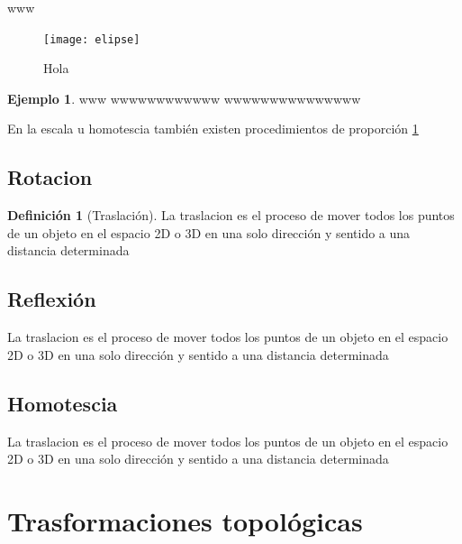 \documentclass[
  16pt,
]{krantz}
\theoremstyle{definition}
\newtheorem{definition}{Definición}[chapter]
\theoremstyle{definition}
\newtheorem{example}{Ejemplo}[chapter]
\theoremstyle{definition}
\theoremstyle{definition}
\theoremstyle{remark}
\begin{document}
www

\begin{figure}

{\centering \texttt{[image: elipse]} 

}

\caption{Hola}\label{fig:Doge}
\end{figure}

\begin{example}
\protect\hypertarget{exm:unnamed-chunk-4}{}{\label{exm:unnamed-chunk-4} }www wwwwwwwwwwww wwwwwwwwwwwwwww
\end{example}

En la escala u homotescia también existen procedimientos de proporción \ref{fig:Doge}

\hypertarget{rotacion}{%
\subsection{Rotacion}\label{rotacion}}

\begin{definition}[Traslación]
\protect\hypertarget{def:rotacion}{}{\label{def:rotacion} {} }La traslacion es el proceso de mover todos los puntos de un objeto en el espacio 2D o 3D en una solo dirección y sentido a una distancia determinada
\end{definition}

\hypertarget{reflexiuxf3n}{%
\subsection{Reflexión}\label{reflexiuxf3n}}

La traslacion es el proceso de mover todos los puntos de un objeto en el espacio 2D o 3D en una solo dirección y sentido a una distancia determinada

\hypertarget{homotescia}{%
\subsection{Homotescia}\label{homotescia}}

La traslacion es el proceso de mover todos los puntos de un objeto en el espacio 2D o 3D en una solo dirección y sentido a una distancia determinada

\hypertarget{trasformaciones-topoluxf3gicas}{%
\section{Trasformaciones topológicas}\label{trasformaciones-topoluxf3gicas}}
\end{document}
